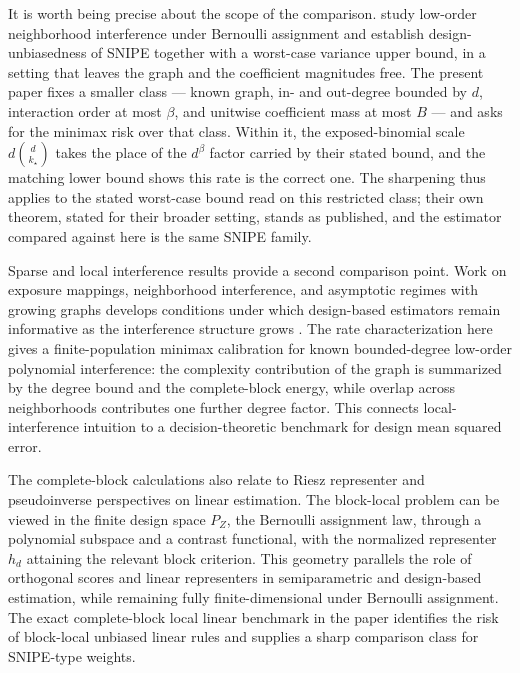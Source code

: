 \documentclass[11pt]{article}
\begin{document}
It is worth being precise about the scope of the comparison. \citet{CortezRodriguezEichhornYu2023} study low-order neighborhood interference under Bernoulli assignment and establish design-unbiasedness of SNIPE together with a worst-case variance upper bound, in a setting that leaves the graph and the coefficient magnitudes free. The present paper fixes a smaller class — known graph, in- and out-degree bounded by \(d\), interaction order at most \(\beta\), and unitwise coefficient mass at most \(B\) — and asks for the minimax risk over that class. Within it, the exposed-binomial scale \(d\binom d{k_\star}\) takes the place of the \(d^{\beta}\) factor carried by their stated bound, and the matching lower bound shows this rate is the correct one. The sharpening thus applies to the stated worst-case bound read on this restricted class; their own theorem, stated for their broader setting, stands as published, and the estimator compared against here is the same SNIPE family.

Sparse and local interference results provide a second comparison point. Work on exposure mappings, neighborhood interference, and asymptotic regimes with growing graphs develops conditions under which design-based estimators remain informative as the interference structure grows \citep{Aronow2017,Athey2018,Baird2018,Basse2018a,Basse2018b,Jagadeesan2020,Savje2021,Leung2022,Hu2022,VazquezBare2023,Gao2025}. The rate characterization here gives a finite-population minimax calibration for known bounded-degree low-order polynomial interference: the complexity contribution of the graph is summarized by the degree bound and the complete-block energy, while overlap across neighborhoods contributes one further degree factor. This connects local-interference intuition to a decision-theoretic benchmark for design mean squared error.

The complete-block calculations also relate to Riesz representer and pseudoinverse perspectives on linear estimation. The block-local problem can be viewed in the finite design space \(P_Z\), the Bernoulli assignment law, through a polynomial subspace and a contrast functional, with the normalized representer \(h_d\) attaining the relevant block criterion. This geometry parallels the role of orthogonal scores and linear representers in semiparametric and design-based estimation, while remaining fully finite-dimensional under Bernoulli assignment. The exact complete-block local linear benchmark in the paper identifies the risk of block-local unbiased linear rules and supplies a sharp comparison class for SNIPE-type weights.
\end{document}
